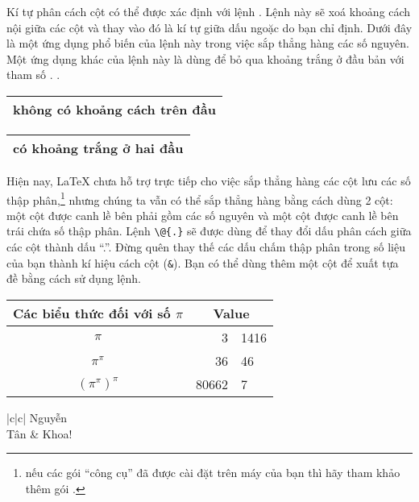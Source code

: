 Kí tự phân cách cột có thể được xác định với lệnh . Lệnh này sẽ xoá khoảng cách nội giữa các cột và thay vào đó là kí tự giữa dấu ngoặc do bạn chỉ định. Dưới đây là một ứng dụng phổ biến của lệnh này trong việc sắp thẳng hàng các số nguyên. Một ứng dụng khác của lệnh này là dùng để bỏ qua khoảng trắng ở đầu bản với tham số .
.
\begin{example}
\begin{tabular}{@{} l @{}}
\hline
không có khoảng cách trên đầu
\\ \hline
\end{tabular}
\end{example}
\begin{example}
\begin{tabular}{l}
\hline
có khoảng trắng ở hai đầu\\
\hline
\end{tabular}
\end{example}
%
%
 Hiện nay, \LaTeX{} chưa hỗ trợ trực tiếp cho việc sắp thẳng hàng các cột lưu các số thập phân,\footnote{nếu các gói ``công cụ'' đã được cài đặt trên máy của bạn thì hãy tham khảo thêm gói .} nhưng chúng ta vẫn có thể sắp thẳng hàng bằng cách dùng 2 cột: một cột được canh lề bên phải gồm các số nguyên và một cột được canh lề bên trái chứa số thập phân. Lệnh \verb|\@{.}| sẽ được dùng để thay đổi dấu phân cách giữa các cột thành dấu ``.''. Đừng quên thay thế các dấu chấm thập phân trong số liệu của bạn thành kí hiệu cách cột (\verb|&|). Bạn có thể dùng thêm một cột để xuất tựa đề bằng cách sử dụng lệnh.

\begin{example}
\begin{tabular}{c r @{.} l}
Các biểu thức đối với số
$\pi$ & \multicolumn{2}{c}{Value}
\\ \hline $\pi$ & 3&1416
\\ $\pi^{\pi}$
& 36&46   \\
$(\pi^{\pi})^{\pi}$
& 80662&7
\\
\end{tabular}
\end{example}
\begin{example}
\begin{tabular}{|c|c|}
\hline {}
{Nguyễn} \\
\hline Tân & Khoa! \\
\hline
\end{tabular}
\end{example}

